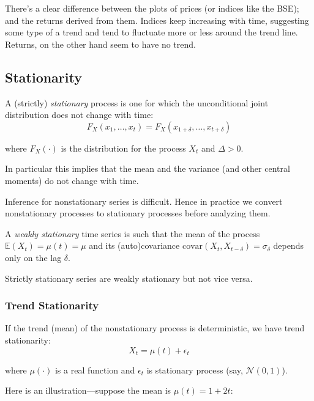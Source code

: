 \documentclass[11pt,]{article}
\begin{document}
There's a clear difference between the plots of prices (or indices like
the BSE); and the returns derived from them. Indices keep increasing
with time, suggesting some type of a trend and tend to fluctuate more or
less around the trend line. Returns, on the other hand seem to have no
trend.

\subsection{Stationarity}\label{stationarity}

A (strictly) \emph{stationary} process is one for which the
unconditional joint distribution does not change with time:
\[F_X(x_1,\hdots,x_t)=F_X(x_{1+\delta},\hdots,x_{t+\delta})\]

where \(F_X(\cdot)\) is the distribution for the process \(X_t\) and
\(\Delta>0\).

In particular this implies that the mean and the variance (and other
central moments) do not change with time.

Inference for nonstationary series is difficult. Hence in practice we
convert nonstationary processes to stationary processes before analyzing
them.

A \emph{weakly stationary} time series is such that the mean of the
process \(\mathbb{E}(X_t) = \mu(t) = \mu\) and its (auto)covariance
\(\text{covar}(X_t, X_{t-\delta}) = \sigma_{\delta}\) depends only on
the lag \(\delta\).

Strictly stationary series are weakly stationary but not vice versa.

\subsubsection{Trend Stationarity}\label{trend-stationarity}

If the trend (mean) of the nonstationary process is deterministic, we
have trend stationarity: \[X_t = \mu(t) + \epsilon_t\]

where \(\mu(\cdot)\) is a real function and \(\epsilon_t\) is stationary
process (say, \(\mathcal{N}(0,1)\)).

Here is an illustration---suppose the mean is \(\mu(t) = 1 + 2t\):
\end{document}
